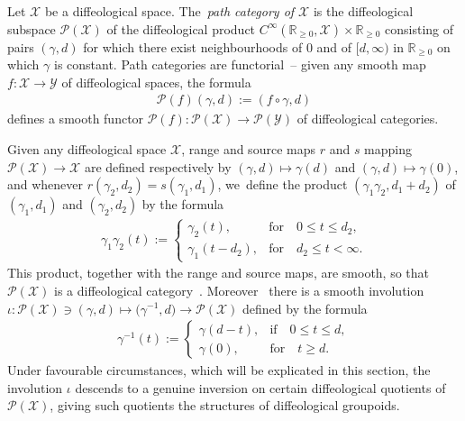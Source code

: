 \documentclass[pdftex]{sigma}
\numberwithin{equation}{section}
\def\PP{{\mathcal{P}}}
\def\YY{{\mathcal{Y}}}
\def\XX{{\mathcal{X}}}
\def\RB{{\mathbb{R}}}
\begin{document}
\begin{Definition}%
Let $\XX$ be a diffeological space. The~\textit{path category of $\XX$} is the diffeological sub\-space $\PP(\XX)$ of the diffeological product $C^{\infty}(\RB_{\geq0},\XX)\times\RB_{\geq0}$ consisting of pairs $(\gamma,d)$ for which there exist neighbourhoods of $0$ and of $[d,\infty)$ in $\RB_{\geq0}$ on which $\gamma$ is constant. Path categories are functorial~-- given any smooth map $f\colon \XX\rightarrow \YY$ of diffeological spaces, the formula
\begin{gather*}
\PP(f)(\gamma,d):=(f\circ\gamma,d)
\end{gather*}
defines a smooth functor $\PP(f)\colon \PP(\XX)\rightarrow \PP(\YY)$ of diffeological categories.
\end{Definition}

Given any diffeological space $\XX$, range and source maps $r$ and $s$ mapping $\PP(\XX)\rightarrow \XX$ are defined respectively by $(\gamma,d)\mapsto \gamma(d)$ and $(\gamma,d)\mapsto\gamma(0)$, and whenever $r(\gamma_{2},d_{2}) = s(\gamma_{1},d_{1})$, we~define the product $(\gamma_{1}\gamma_{2},d_{1}+d_{2})$ of $(\gamma_{1},d_{1})$ and $(\gamma_{2},d_{2})$ by the formula
\begin{gather*}
\gamma_{1}\gamma_{2}(t):=
\begin{cases}
\gamma_{2}(t),&\text{for}\quad 0\leq t\leq d_{2},
\\
\gamma_{1}(t-d_{2}),&\text{for}\quad d_{2}\leq t<\infty.
\end{cases}
\end{gather*}
This product, together with the range and source maps, are smooth, so that $\PP(\XX)$ is a dif\-feo\-lo\-gi\-cal category~\cite[Proposition~3.22]{mac3}. Moreover~\cite[Proposition~3.23]{mac3} there is a smooth involution $\iota\colon \PP(\XX)\ni(\gamma,d)\mapsto\big(\gamma^{-1},d\big)\rightarrow\PP(\XX)$ defined by the formula
\begin{gather*}
\gamma^{-1}(t):=
\begin{cases}
\gamma(d-t),&\text{if}\quad 0\leq t\leq d,
\\
\gamma(0),&\text{for}\quad t\geq d.
\end{cases}
\end{gather*}
Under favourable circumstances, which will be explicated in this section, the involution $\iota$ des\-cends to a genuine inversion on certain diffeological quotients of $\PP(\XX)$, giving such quotients the structures of diffeological groupoids.
\end{document}
